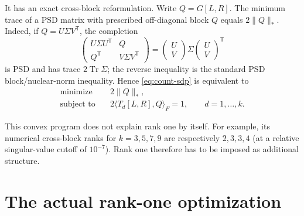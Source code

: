 \documentclass[11pt]{article}
\newcommand{\1}{\mathbf 1}
\newcommand{\Tr}{\operatorname{Tr}}
\newcommand{\norm}[1]{\lVert#1\rVert}
\newcommand{\ip}[2]{\langle #1,#2\rangle}
\begin{document}
It has an exact cross-block reformulation.  Write $Q=G[L,R]$.  The minimum
trace of a PSD matrix with prescribed off-diagonal block $Q$ equals
$2\norm{Q}_*$.  Indeed, if $Q=U\Sigma V^{\mathsf T}$, the completion
\[
 \begin{pmatrix}U\Sigma U^{\mathsf T}&Q\\
 Q^{\mathsf T}&V\Sigma V^{\mathsf T}\end{pmatrix}
 =\begin{pmatrix}U\\V\end{pmatrix}\Sigma
  \begin{pmatrix}U\\V\end{pmatrix}^{\!\mathsf T}
\]
is PSD and has trace $2\Tr\Sigma$; the reverse inequality is the standard
PSD block/nuclear-norm inequality.  Hence \eqref{eq:count-sdp} is equivalent
to
\begin{equation}
 \boxed{
 \begin{aligned}
  \text{minimize}\quad&2\norm Q_*,\\
  \text{subject to}\quad&2\ip{T_d[L,R]}Q_F=1,
                   \qquad d=1,\ldots,k .
 \end{aligned}}                                         \tag{N$_k$}\label{eq:nuclear}
\end{equation}

This convex program does not explain rank one by itself.  For example, its
numerical cross-block ranks for $k=3,5,7,9$ are respectively $2,3,3,4$
(at a relative singular-value cutoff of $10^{-7}$).  Rank one therefore has
to be imposed as additional structure.

\section{The actual rank-one optimization}
\end{document}
